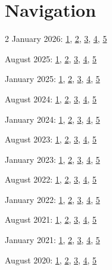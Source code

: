 
\section*{Navigation}

\makeatletter
{}
\makeatother

\begin{multicols}{2}
January 2026:
\hyperref[qu:Jan26_1]{1},
\hyperref[qu:Jan26_2]{2},
\hyperref[qu:Jan26_3]{3},
\hyperref[qu:Jan26_4]{4},
\hyperref[qu:Jan26_5]{5}

August 2025:
\hyperref[qu:Aug25_1]{1},
\hyperref[qu:Aug25_2]{2},
\hyperref[qu:Aug25_3]{3},
\hyperref[qu:Aug25_4]{4},
\hyperref[qu:Aug25_5]{5}

January 2025:
\hyperref[qu:Jan25_1]{1},
\hyperref[qu:Jan25_2]{2},
\hyperref[qu:Jan25_3]{3},
\hyperref[qu:Jan25_4]{4},
\hyperref[qu:Jan25_5]{5}

August 2024:
\hyperref[qu:Aug24_1]{1},
\hyperref[qu:Aug24_2]{2},
\hyperref[qu:Aug24_3]{3},
\hyperref[qu:Aug24_3+16_1]{4},
\hyperref[qu:Aug24_5]{5}

January 2024:
\hyperref[qu:Jan24_1]{1},
\hyperref[qu:Jan24_2]{2},
\hyperref[qu:Jan24_3]{3},
\hyperref[qu:Jan24_4]{4},
\hyperref[qu:Jan24_5]{5}

August 2023:
\hyperref[qu:Aug23_1]{1},
\hyperref[qu:Aug23_2]{2},
\hyperref[qu:Aug23_3]{3},
\hyperref[qu:Aug23_4]{4},
\hyperref[qu:Aug23_5]{5}

January 2023:
\hyperref[qu:Jan23_1]{1},
\hyperref[qu:Jan23_2]{2},
\hyperref[qu:Jan23_3]{3},
\hyperref[qu:Jan23_4]{4},
\hyperref[qu:Jan23_5]{5}

August 2022:
\hyperref[qu:Aug22_1]{1},
\hyperref[qu:Aug22_2]{2},
\hyperref[qu:Aug22_3]{3},
\hyperref[qu:Aug22_4]{4},
\hyperref[qu:Aug22_5]{5}

January 2022:
\hyperref[qu:Jan22_1]{1},
\hyperref[qu:Jan22_2]{2},
\hyperref[qu:Jan22_3]{3},
\hyperref[qu:Jan22_4]{4},
\hyperref[qu:Jan22_5]{5}

August 2021:
\hyperref[qu:Aug21_1]{1},
\hyperref[qu:Aug21_2]{2},
\hyperref[qu:Aug21_3]{3},
\hyperref[qu:Aug21_4]{4},
\hyperref[qu:Aug21_5]{5}

January 2021:
\hyperref[qu:Jan21_1]{1},
\hyperref[qu:Jan21_2]{2},
\hyperref[qu:Jan21_3]{3},
\hyperref[qu:Jan21_4]{4},
\hyperref[qu:Jan21_5]{5}

August 2020:
\hyperref[qu:Aug20_1]{1},
\hyperref[qu:Aug20_2]{2},
\hyperref[qu:Aug20_3]{3},
\hyperref[qu:Aug20_4]{4},
\hyperref[qu:Aug20_5]{5}


\end{multicols}
